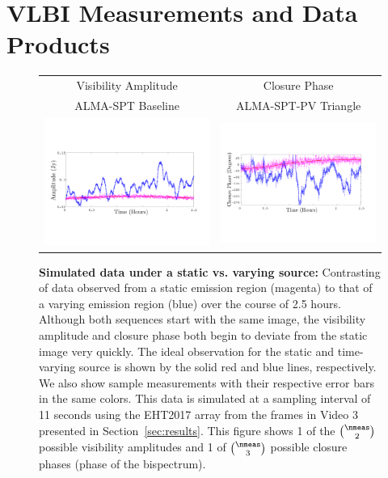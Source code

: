 \section{VLBI Measurements and Data Products}
\label{sec:meas}



\begin{figure}[h!]
	\vspace{-.3in}
	\begin{center}
		\begin{tabular}{  c  c   }
			\large{\textsf{Visibility Amplitude}}   &\large{\textsf{Closure Phase}}      \\ 
			\small{\textsf{ALMA-SPT Baseline}}   &\small{\textsf{ALMA-SPT-PV Triangle}}      \\ 
			\includegraphics[width=.47\linewidth]{figures/compare_var2static/visamplitudes_notitle_editted.pdf} &
			\includegraphics[width=.47\linewidth]{figures/compare_var2static/closurephase_notitle_editted.pdf} 
			\\
		\end{tabular}
		\caption{{\bf Simulated data under a static vs. varying source:} Contrasting of data observed from a static emission region (magenta) to that of a varying emission region (blue) over the course of 2.5 hours. Although both sequences start with the same image, the visibility amplitude and closure phase both begin to deviate from the static image very quickly. The ideal observation for the static and time-varying source is shown by the solid red and blue lines, respectively. We also show sample measurements with their respective error bars in the same colors. This data is simulated at a sampling interval of 11 seconds using the EHT2017 array from the frames in Video 3 presented in Section~\ref{sec:results}. This figure shows 1 of the ${\nmeas \choose 2}$ possible visibility amplitudes and 1 of ${\nmeas \choose 3}$ possible closure phases (phase of the bispectrum). }

\end{center}
\end{figure}
